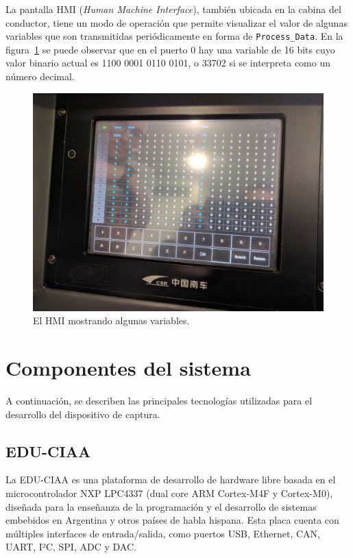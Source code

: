 La pantalla HMI (\textit{Human Machine Interface}), también ubicada en la cabina del conductor, tiene un modo de operación que permite visualizar el valor de algunas variables que son transmitidas periódicamente en forma de \texttt{Process\_Data}. En la figura~\ref{fig:hmi} se puede observar que en el puerto 0 hay una variable de 16 bits cuyo valor binario actual es 1100 0001 0110 0101, o 33702 si se interpreta como un número decimal.

\begin{figure}[htbp]
	\centering
	\includegraphics[width=1\textwidth]{./Figures/hmi.jpg}
	\caption[El HMI mostrando algunas variables]{El HMI mostrando algunas variables.}
    \label{fig:hmi}
\end{figure}



\section{Componentes del sistema}

A continuación, se describen las principales tecnologías utilizadas para el desarrollo del dispositivo de captura.

\subsection{EDU-CIAA}

La EDU-CIAA \cite{web:ciaa} es una plataforma de desarrollo de hardware libre basada en el microcontrolador NXP LPC4337 \cite{web:lpc4337} (dual core ARM Cortex-M4F y Cortex-M0), diseñada para la enseñanza de la programación y el desarrollo de sistemas embebidos en Argentina y otros países de habla hispana.
Esta placa cuenta con múltiples interfaces de entrada/salida, como puertos USB, Ethernet, CAN, UART, I²C, SPI, ADC y DAC.

